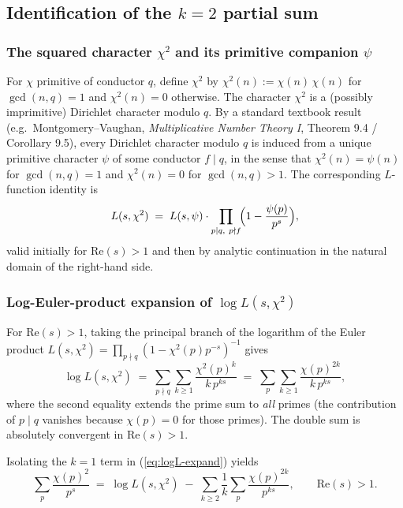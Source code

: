 \subsection{Identification of the \(k = 2\) partial sum}

\subsubsection{The squared character \(\chi^2\) and its primitive companion \(\psi\)}

For \(\chi\) primitive of conductor \(q\), define \(\chi^2\) by
\(\chi^2(n) := \chi(n)\,\chi(n)\) for \(\gcd(n, q) = 1\) and \(\chi^2(n) = 0\)
otherwise. The character \(\chi^2\) is a (possibly imprimitive)
Dirichlet character modulo \(q\). By a standard textbook result
(e.g.~Montgomery--Vaughan, \emph{Multiplicative Number Theory I}, Theorem
9.4 / Corollary 9.5), every Dirichlet character modulo \(q\) is induced
from a unique primitive character \(\psi\) of some conductor \(f \mid q\),
in the sense that \(\chi^2(n) = \psi(n)\) for \(\gcd(n, q) = 1\) and
\(\chi^2(n) = 0\) for \(\gcd(n, q) > 1\). The corresponding
\(L\)-function identity is
\begin{equation}
\label{eq:imprimitive}
L(s, \chi^2) \;=\; L(s, \psi) \cdot
\prod_{p \mid q,\ p \nmid f}\!\Bigl(1 - \frac{\psi(p)}{p^s}\Bigr),
\end{equation}
valid initially for \(\mathrm{Re}(s) > 1\) and then by analytic
continuation in the natural domain of the right-hand side.

\subsubsection{Log-Euler-product expansion of \(\log L(s, \chi^2)\)}

For \(\mathrm{Re}(s) > 1\), taking the principal branch of the logarithm
of the Euler product
\(L(s, \chi^2) = \prod_{p \nmid q}(1 - \chi^2(p) p^{-s})^{-1}\) gives
\begin{equation}
\label{eq:logL-expand}
\log L(s, \chi^2)
\;=\;
\sum_{p \nmid q} \sum_{k \ge 1}
\frac{\chi^2(p)^k}{k\, p^{ks}}
\;=\;
\sum_{p} \sum_{k \ge 1}
\frac{\chi(p)^{2k}}{k\, p^{ks}},
\end{equation}
where the second equality extends the prime sum to \emph{all} primes (the
contribution of \(p \mid q\) vanishes because \(\chi(p) = 0\) for those
primes). The double sum is absolutely convergent in
\(\mathrm{Re}(s) > 1\).

Isolating the \(k = 1\) term in (\ref{eq:logL-expand}) yields
\begin{equation}
\label{eq:k1-isolation}
\sum_{p} \frac{\chi(p)^2}{p^{s}}
\;=\;
\log L(s, \chi^2)
\;-\; \sum_{k \ge 2} \frac{1}{k} \sum_{p}
\frac{\chi(p)^{2k}}{p^{ks}},
\qquad \mathrm{Re}(s) > 1.
\end{equation}

